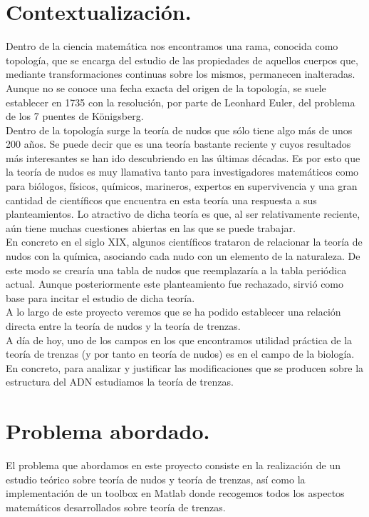 \section{Contextualización.}
Dentro de la ciencia matemática nos encontramos una rama, conocida como topología, que se encarga del estudio de las propiedades de aquellos cuerpos que, mediante transformaciones continuas sobre los mismos, permanecen inalteradas. Aunque no se conoce una fecha exacta del origen de la topología, se suele establecer en 1735 con la resolución, por parte de Leonhard Euler, del problema de los 7 puentes de Königsberg.\\

Dentro de la topología surge la teoría de nudos que sólo tiene algo más de unos 200 años. Se puede decir que es una teoría bastante reciente y cuyos resultados más interesantes se han ido descubriendo en las últimas décadas. Es por esto que la teoría de nudos es muy llamativa tanto para investigadores matemáticos como para biólogos, físicos, químicos, marineros, expertos en supervivencia y una gran cantidad de científicos que encuentra en esta teoría una respuesta a sus planteamientos. Lo atractivo de dicha teoría es que, al ser relativamente reciente, aún tiene muchas cuestiones abiertas en las que se puede trabajar. \\

En concreto en el siglo XIX, algunos científicos trataron de relacionar la teoría de nudos con la química, asociando cada nudo con un elemento de la naturaleza. De este modo se crearía una tabla de nudos que reemplazaría a la tabla periódica actual. Aunque posteriormente este planteamiento fue rechazado, sirvió como base para incitar el estudio de dicha teoría. \\

A lo largo de este proyecto veremos que se ha podido establecer una relación directa entre la teoría de nudos y la teoría de trenzas. \\

A día de hoy, uno de los campos en los que encontramos utilidad práctica de la teoría de trenzas (y por tanto en teoría de nudos) es en el campo de la biología. En concreto, para analizar y justificar las modificaciones que se producen sobre la estructura del ADN estudiamos la teoría de trenzas. \\
 
\section{Problema abordado.}
El problema que abordamos en este proyecto consiste en la realización de un estudio teórico sobre teoría de nudos y teoría de trenzas, así como la implementación de un toolbox en Matlab donde recogemos todos los aspectos matemáticos desarrollados sobre teoría de trenzas. \\

